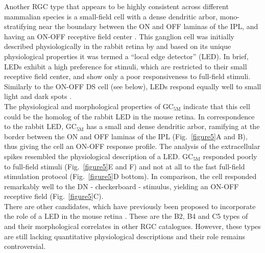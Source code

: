Another RGC type that appears to be highly consistent across different mammalian species is a small-field cell with a dense dendritic arbor, mono-stratifying near the boundary between the ON and OFF laminas of the IPL, and having an ON-OFF receptive field center \citep{berson08}. This ganglion cell was initially described physiologically in the rabbit retina by \citet{Levick67} and based on its unique physiological properties it was termed a “local edge detector” (LED). In brief, LEDs exhibit a high preference for stimuli, which are restricted to their small receptive field center, and show only a poor responsiveness to full-field stimuli. Similarly to the ON-OFF DS cell (see below), LEDs respond equally well to small light and dark spots \citep{berson08}.  \\
The physiological and morphological properties of GC$_{\text{5M}}$ indicate that this cell could be the homolog of the rabbit LED in the mouse retina. In correspondence to the rabbit LED, GC$_{\text{5M}}$ has a small and dense dendritic arbor, ramifying at the border between the ON and OFF laminas of the IPL (Fig.~\ref{figure5}A and B), thus giving the cell an ON-OFF response profile. The analysis of the extracellular spikes resembled the physiological description of a LED. GC$_{\text{5M}}$ responded poorly to full-field stimuli (Fig.~\ref{figure5}E and F) and not at all to the fast full-field stimulation protocol (Fig.~\ref{figure5}D bottom). In comparison, the cell responded remarkably well to the DN - checkerboard - stimulus, yielding an ON-OFF receptive field (Fig.~\ref{figure5}C).\\
There are other candidates, which have previously been proposed to incorporate the role of a LED in the mouse retina \citep{berson08}. These are the B2, B4 and C5 types of \citet{sun02} and their morphological correlates in other RGC catalogues. However, these types are still lacking quantitative physiological descriptions and their role remains controversial. 

